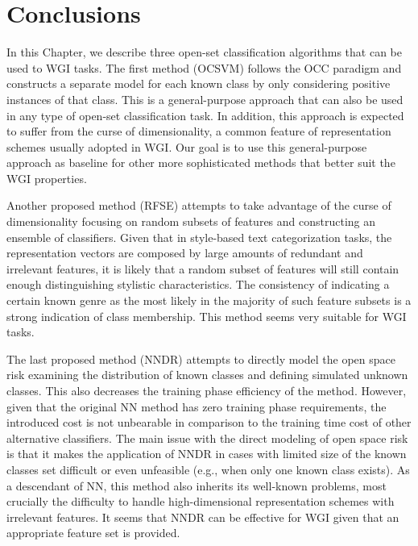 \section{Conclusions}\label{chap:openset:sec:NNRD_Description}

In this Chapter, we describe three open-set classification algorithms that can be used to WGI tasks. The first method (OCSVM) follows the OCC paradigm and constructs a separate model for each known class by only considering positive instances of that class. This is a general-purpose approach that can also be used in any type of open-set classification task. In addition, this approach is expected to suffer from the curse of dimensionality, a common feature of representation schemes usually adopted in WGI. Our goal is to use this general-purpose approach as baseline for other more sophisticated methods that better suit the WGI properties.

Another proposed method (RFSE) attempts to take advantage of the curse of dimensionality focusing on random subsets of features and constructing an ensemble of classifiers. Given that in style-based text categorization tasks, the representation vectors are composed by large amounts of redundant and irrelevant features, it is likely that a random subset of features will still contain enough distinguishing stylistic characteristics. The consistency of indicating a certain known genre as the most likely in the majority of such feature subsets is a strong indication of class membership. This method seems very suitable for WGI tasks. 

The last proposed method (NNDR) attempts to directly model the open space risk examining the distribution of known classes and defining simulated unknown classes. This also decreases the training phase efficiency of the method. However, given that the original NN method has zero training phase requirements, the introduced cost is not unbearable in comparison to the training time cost of other alternative classifiers. The main issue with the direct modeling of open space risk is that it makes the application of NNDR in cases with limited size of the known classes set difficult or even unfeasible (e.g., when only one known class exists). As a descendant of NN, this method also inherits its well-known problems, most crucially the difficulty to handle high-dimensional representation schemes with irrelevant features. It seems that NNDR can be effective for WGI given that an appropriate feature set is provided.